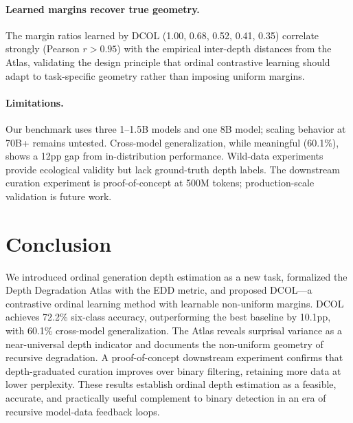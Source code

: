 \documentclass[11pt,a4paper]{article}
\newcommand{\ours}{DCOL}
\newcommand{\atlas}{Atlas}
\begin{document}
\paragraph{Learned margins recover true geometry.}
The margin ratios learned by \ours{} (1.00, 0.68, 0.52, 0.41, 0.35) correlate strongly (Pearson $r > 0.95$) with the empirical inter-depth distances from the \atlas{}, validating the design principle that ordinal contrastive learning should adapt to task-specific geometry rather than imposing uniform margins.

\paragraph{Limitations.}
Our benchmark uses three 1--1.5B models and one 8B model; scaling behavior at 70B+ remains untested.
Cross-model generalization, while meaningful (60.1\%), shows a 12pp gap from in-distribution performance.
Wild-data experiments provide ecological validity but lack ground-truth depth labels.
The downstream curation experiment is proof-of-concept at 500M tokens; production-scale validation is future work.

\section{Conclusion}

We introduced ordinal generation depth estimation as a new task, formalized the Depth Degradation \atlas{} with the EDD metric, and proposed \ours{}---a contrastive ordinal learning method with learnable non-uniform margins.
\ours{} achieves 72.2\% six-class accuracy, outperforming the best baseline by 10.1pp, with 60.1\% cross-model generalization.
The \atlas{} reveals surprisal variance as a near-universal depth indicator and documents the non-uniform geometry of recursive degradation.
A proof-of-concept downstream experiment confirms that depth-graduated curation improves over binary filtering, retaining more data at lower perplexity.
These results establish ordinal depth estimation as a feasible, accurate, and practically useful complement to binary detection in an era of recursive model-data feedback loops.


\end{document}
